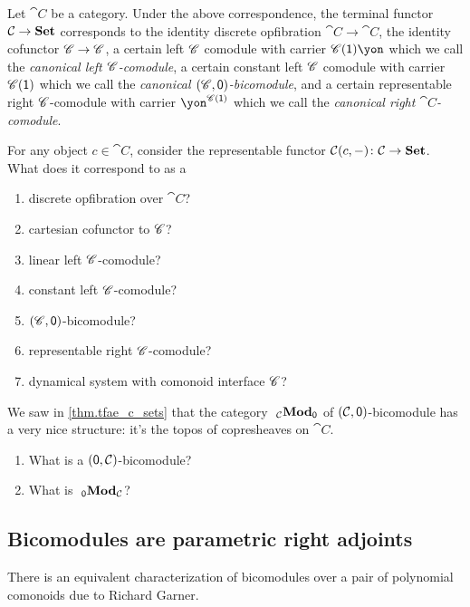 \documentclass[Book-Poly]{subfiles}
\begin{document}
Let $\cat{C}$ be a category. Under the above correspondence, the terminal functor $\mathcal{C}\to\mathbf{Set}$ corresponds to the identity discrete opfibration $\cat{C}\to\cat{C}$, the identity cofunctor $\mathscr{C}\to\mathscr{C}$, a certain left $\mathscr{C}$ comodule with carrier $\com{C}(\1)\yon$ which we call the \emph{canonical left $\mathscr{C}$-comodule}, a certain constant left $\mathscr{C}$ comodule with carrier $\mathscr{C}(\textsf{1})$ which we call the \emph{canonical $(\mathscr{C},\textsf{0})$-bicomodule}, and a certain representable right $\mathscr{C}$-comodule with carrier $\yon^{\com{C}(\1)}$ which we call the \emph{canonical right $\cat{C}$-comodule}.

\begin{exercise}
For any object $c\in \cat{C}$, consider the representable functor $\mathcal{C}(c,-)\colon\mathcal{C}\to\mathbf{Set}$. What does it correspond to as a
\begin{enumerate}
	\item discrete opfibration over $\cat{C}$?
	\item cartesian cofunctor to $\mathscr{C}$?
	\item linear left $\mathscr{C}$-comodule?
	\item constant left $\mathscr{C}$-comodule?
	\item $(\mathscr{C},\textsf{0})$-bicomodule?
	\item representable right $\mathscr{C}$-comodule?
	\item dynamical system with comonoid interface $\mathscr{C}$?
\qedhere
\end{enumerate}
\end{exercise}

\begin{exercise}
We saw in \cref{thm.tfae_c_sets} that the category $~_{\mathcal{C}}\mathbf{Mod}_{\textsf{0}}$ of $(\mathcal{C},\textsf{0})$-bicomodule has a very nice structure: it's the topos of copresheaves on $\cat{C}$.
\begin{enumerate}
	\item What is a $(\textsf{0},\mathcal{C})$-bicomodule?
	\item What is $~_{\textsf{0}}\mathbf{Mod}_{\mathcal{C}}$?
\qedhere
\end{enumerate}
\end{exercise}

\subsection{Bicomodules are parametric right adjoints}

There is an equivalent characterization of bicomodules over a pair of polynomial comonoids due to Richard Garner.
\end{document}
